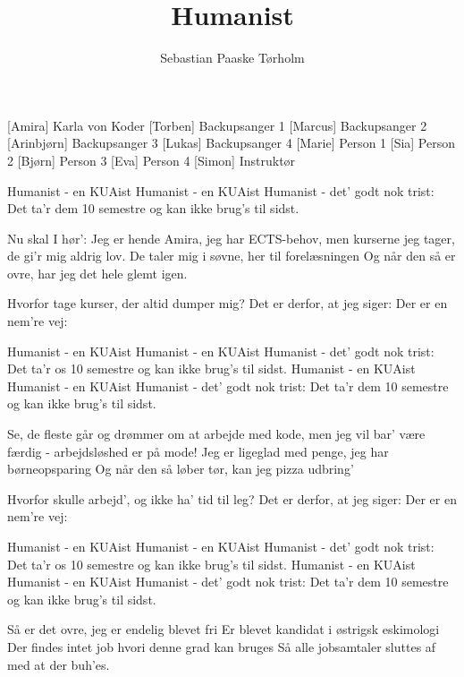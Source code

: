 \documentclass[a4paper,11pt]{article}
\title{Humanist}
\author{Sebastian Paaske Tørholm}
\begin{document}
\maketitle

\begin{roles}
[Amira] Karla von Koder
[Torben] Backupsanger 1
[Marcus] Backupsanger 2
[Arinbjørn] Backupsanger 3
[Lukas] Backupsanger 4
[Marie] Person 1
[Sia] Person 2
[Bjørn] Person 3
[Eva] Person 4
[Simon] Instruktør
\end{roles}

\begin{song}
     {
        Humanist - en KUAist
        Humanist - en KUAist
        Humanist - det’ godt nok trist:
        Det ta’r dem 10 semestre
        og kan ikke brug’s til sidst.
    }
%
     {
        Nu skal I hør':
        Jeg er hende Amira, jeg har ECTS-behov,
        men kurserne jeg tager, de gi’r mig aldrig lov.
        De taler mig i søvne, her til forelæsningen
        Og når den så er ovre, har jeg det hele glemt igen.

        Hvorfor tage kurser, der altid dumper mig?
        Det er derfor, at jeg siger: Der er en nem're vej:
    }
     {
        Humanist - en KUAist
        Humanist - en KUAist
        Humanist - det’ godt nok trist:
        Det ta’r os 10 semestre
        og kan ikke brug’s til sidst.
    }
     {
        Humanist - en KUAist
        Humanist - en KUAist
        Humanist - det’ godt nok trist:
        Det ta’r dem 10 semestre
        og kan ikke brug’s til sidst.
    }
%
     {
        Se, de fleste går og drømmer om at arbejde med kode,
        men jeg vil bar’ være færdig - arbejdsløshed er på mode!
        Jeg er ligeglad med penge, jeg har børneopsparing
        Og når den så løber tør, kan jeg pizza udbring’

        Hvorfor skulle arbejd’, og ikke ha’ tid til leg?
        Det er derfor, at jeg siger: Der er en nem're vej:
    }
     {
        Humanist - en KUAist
        Humanist - en KUAist
        Humanist - det’ godt nok trist:
        Det ta’r os 10 semestre
        og kan ikke brug’s til sidst.
    }
     {
        Humanist - en KUAist
        Humanist - en KUAist
        Humanist - det’ godt nok trist:
        Det ta’r dem 10 semestre
        og kan ikke brug’s til sidst.
    }
%
     {
        Så er det ovre, jeg er endelig blevet fri
        Er blevet kandidat i østrigsk eskimologi
        Der findes intet job hvori denne grad kan bruges
        Så alle jobsamtaler sluttes af med at der buh’es.

}
\end{song}
\end{document}
